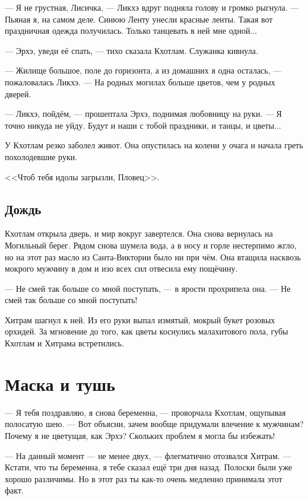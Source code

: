 --- Я не грустная, Лисичка, --- Ликхэ вдруг подняла голову и громко рыгнула.
--- Пьяная я, на самом деле.
Синюю Ленту унесли красные ленты.
Такая вот праздничная одежда получилась.
Только танцевать в ней мне одной...

--- Эрхэ, уведи её спать, --- тихо сказала Кхотлам.
Служанка кивнула.

--- Жилище большое, поле до горизонта, а из домашних я одна осталась, --- пожаловалась Ликхэ.
--- На родных могилах больше цветов, чем у родных дверей.

--- Ликхэ, пойдём, --- прошептала Эрхэ, поднимая любовницу на руки.
--- Я точно никуда не уйду.
Будут и наши с тобой праздники, и танцы, и цветы...

У Кхотлам резко заболел живот.
Она опустилась на колени у очага и начала греть похолодевшие руки.

<<Чтоб тебя идолы загрызли, Пловец>>.

\section{Дождь}

Кхотлам открыла дверь, и мир вокруг завертелся.
Она снова вернулась на Могильный берег.
Рядом снова шумела вода, а в носу и горле нестерпимо жгло, но на этот раз масло из Санта-Виктории было ни при чём.
Она втащила насквозь мокрого мужчину в дом и изо всех сил отвесила ему пощёчину.

--- Не смей так больше со мной поступать, --- в ярости прохрипела она.
--- Не смей так больше со мной поступать!

Хитрам шагнул к ней.
Из его руки выпал измятый, мокрый букет розовых орхидей.
За мгновение до того, как цветы коснулись малахитового пола, губы Кхотлам и Хитрама встретились.

\chapter{Маска и тушь}

--- Я тебя поздравляю, я снова беременна, --- проворчала Кхотлам, ощупывая полосатую шею.
--- Вот объясни, зачем вообще придумали влечение к мужчинам?
Почему я не цветущая, как Эрхэ?
Скольких проблем я могла бы избежать!

--- На данный момент --- не менее двух, --- флегматично отозвался Хитрам.
--- Кстати, что ты беременна, я тебе сказал ещё три дня назад.
Полоски были уже хорошо различимы.
Но в этот раз ты как-то очень медленно принимала этот факт.

